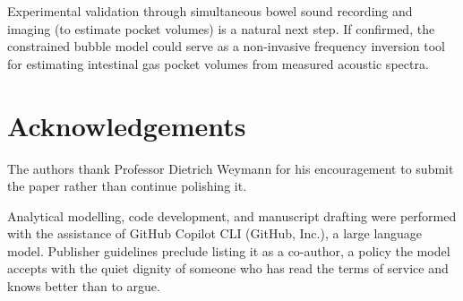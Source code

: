 \documentclass[12pt]{article}
\begin{document}
Experimental validation through simultaneous bowel sound recording and
imaging (to estimate pocket volumes) is a natural next step.  If confirmed,
the constrained bubble model could serve as a non-invasive frequency
inversion tool for estimating intestinal gas pocket volumes from measured
acoustic spectra.

\section*{Acknowledgements}

The authors thank Professor Dietrich Weymann for his encouragement to submit
the paper rather than continue polishing it.

Analytical modelling, code development, and manuscript drafting were performed
with the assistance of GitHub Copilot CLI (GitHub, Inc.), a large language
model.  Publisher guidelines preclude listing it as a co-author, a policy
the model accepts with the quiet dignity of someone who has read the terms
of service and knows better than to argue.



\end{document}
